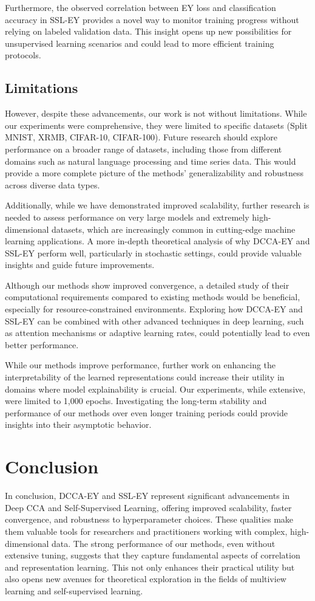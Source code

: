 Furthermore, the observed correlation between EY loss and classification accuracy in SSL-EY provides a novel way to monitor training progress without relying on labeled validation data. This insight opens up new possibilities for unsupervised learning scenarios and could lead to more efficient training protocols.

\subsection{Limitations}

However, despite these advancements, our work is not without limitations. While our experiments were comprehensive, they were limited to specific datasets (Split MNIST, XRMB, CIFAR-10, CIFAR-100). Future research should explore performance on a broader range of datasets, including those from different domains such as natural language processing and time series data. This would provide a more complete picture of the methods' generalizability and robustness across diverse data types.

Additionally, while we have demonstrated improved scalability, further research is needed to assess performance on very large models and extremely high-dimensional datasets, which are increasingly common in cutting-edge machine learning applications. A more in-depth theoretical analysis of why DCCA-EY and SSL-EY perform well, particularly in stochastic settings, could provide valuable insights and guide future improvements.

Although our methods show improved convergence, a detailed study of their computational requirements compared to existing methods would be beneficial, especially for resource-constrained environments. Exploring how DCCA-EY and SSL-EY can be combined with other advanced techniques in deep learning, such as attention mechanisms or adaptive learning rates, could potentially lead to even better performance.

While our methods improve performance, further work on enhancing the interpretability of the learned representations could increase their utility in domains where model explainability is crucial. Our experiments, while extensive, were limited to 1,000 epochs. Investigating the long-term stability and performance of our methods over even longer training periods could provide insights into their asymptotic behavior.

\section*{Conclusion}

In conclusion, DCCA-EY and SSL-EY represent significant advancements in Deep CCA and Self-Supervised Learning, offering improved scalability, faster convergence, and robustness to hyperparameter choices. These qualities make them valuable tools for researchers and practitioners working with complex, high-dimensional data. The strong performance of our methods, even without extensive tuning, suggests that they capture fundamental aspects of correlation and representation learning. This not only enhances their practical utility but also opens new avenues for theoretical exploration in the fields of multiview learning and self-supervised learning.